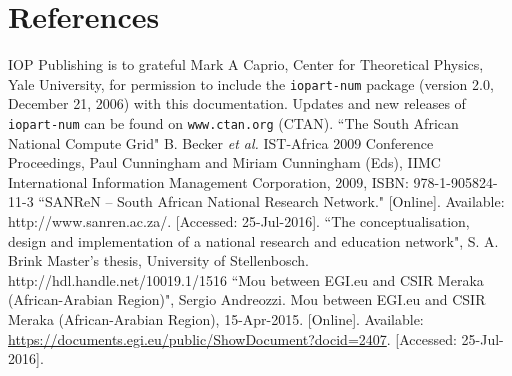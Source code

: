\documentclass[a4paper]{jpconf}
\begin{document}
\section*{References}
\begin{thebibliography}{9}
 IOP Publishing is to grateful Mark A Caprio, Center for Theoretical Physics, Yale University, for permission to include the {\tt iopart-num} \BibTeX package (version 2.0, December 21, 2006) with  this documentation. Updates and new releases of {\tt iopart-num} can be found on \verb"www.ctan.org" (CTAN).
  ``The South African National Compute Grid" B. Becker {\it et al.} IST-Africa 2009 Conference Proceedings, Paul Cunningham and Miriam Cunningham (Eds), IIMC International Information Management Corporation, 2009, ISBN: 978-1-905824-11-3
 ``SANReN – South African National Research Network." [Online]. Available: http://www.sanren.ac.za/. [Accessed: 25-Jul-2016].
 ``The conceptualisation, design and implementation of a national research and education network", S. A. Brink Master's thesis, University of Stellenbosch. http://hdl.handle.net/10019.1/1516
 ``Mou between EGI.eu and CSIR Meraka (African-Arabian Region)", Sergio Andreozzi. Mou between EGI.eu and CSIR Meraka (African-Arabian Region), 15-Apr-2015. [Online]. Available: \url{https://documents.egi.eu/public/ShowDocument?docid=2407}. [Accessed: 25-Jul-2016].

\end{thebibliography}

% 
\end{document}
